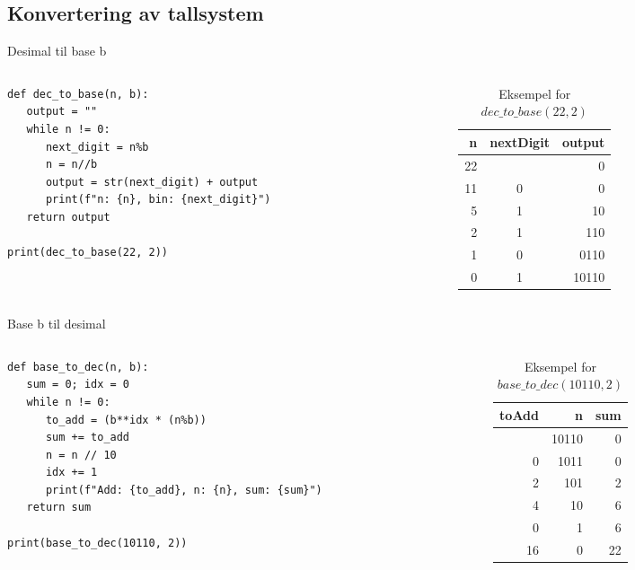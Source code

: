 \subsection*{Konvertering av tallsystem}
\begin{frame}[fragile]{Desimal til base b}
\begin{columns}
    \begin{column}{0.68\textwidth}
\begin{verbatim}
def dec_to_base(n, b):
   output = ""
   while n != 0:
      next_digit = n%b
      n = n//b
      output = str(next_digit) + output
      print(f"n: {n}, bin: {next_digit}")
   return output

print(dec_to_base(22, 2))
\end{verbatim}
 	\end{column}
 	\pause
    \begin{column}{0.28\textwidth}
\begin{table}
\begin{tabular}{r|c|r}
n & nextDigit & output \\ \hline
22 & & 0 \\
11 & 0 & 0\\
5 & 1 & 10\\
2 & 1 & 110\\
1 & 0 & 0110\\
0 & 1 & 10110
\end{tabular}
\caption{Eksempel for $dec\_to\_base(22, 2)$}
\end{table}
 	\end{column}
 	\end{columns}
\end{frame}

\begin{frame}[fragile]{Base b til desimal}
\begin{columns}
    \begin{column}{0.68\textwidth}
\begin{verbatim}
def base_to_dec(n, b):
   sum = 0; idx = 0
   while n != 0:
      to_add = (b**idx * (n%b))
      sum += to_add
      n = n // 10
      idx += 1
      print(f"Add: {to_add}, n: {n}, sum: {sum}")
   return sum

print(base_to_dec(10110, 2))
\end{verbatim}
 	\end{column}
 	\pause
    \begin{column}{0.28\textwidth}
\begin{table}
\begin{tabular}{r|r|r}
toAdd & n & sum \\ \hline
 & 10110 & 0\\
0 & 1011 & 0\\
2 & 101 & 2\\
4 & 10 & 6\\
0 & 1 & 6\\
16 & 0 & 22
\end{tabular}
\caption{Eksempel for $base\_to\_dec(10110, 2)$}
\end{table}
 	\end{column}
 	\end{columns}
\end{frame}

